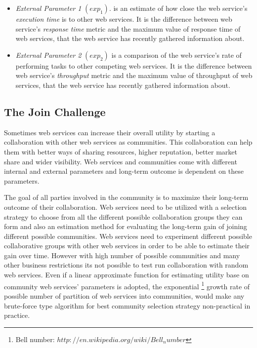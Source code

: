 \documentclass[10pt,journal,cspaper,compsoc]{IEEEtran}
\begin{document}
\begin{itemize}
  \item \emph{External Parameter 1} $(exp_1)$. is an estimate of how close the web service's \emph{execution time} is to other web services. It is the difference between web service's \emph{response time} metric and the maximum value of response time of web services, that the web service has recently gathered information about.
	\item \emph{External Parameter 2} $(exp_2)$ is a comparison of the web service's rate of performing tasks to other competing web services. It is the difference between web service's \emph{throughput} metric and the maximum value of throughput of web services, that the web service has recently gathered information about.
\end{itemize}

\subsection{The Join Challenge}\label{s:tjc}
Sometimes web services can increase their overall utility by starting a collaboration with other web services as communities. This collaboration can help them with better ways of sharing resources, higher reputation, better market share and wider visibility. Web services and communities come with different internal and external parameters and long-term outcome is dependent on these parameters. 

The goal of all parties involved in the community is to maximize their long-term outcome of their collaboration. Web services need to be utilized with a selection strategy to choose from all the different possible collaboration groups they can form and also an estimation method for evaluating the long-term gain of joining different possible communities. Web services need to experiment different possible collaborative groups with other web services in order to be able to estimate their gain over time. However with high number of possible communities and many other business restrictions its not possible to test run collaboration with random web services. Even if a linear approximate function for estimating utility base on community web services' parameters is adopted, the exponential \footnote{Bell number: $http://en.wikipedia.org/wiki/Bell_number$} growth rate of possible number of partition of web services into communities, would make any brute-force type algorithm for best community selection strategy non-practical in practice.
\end{document}
